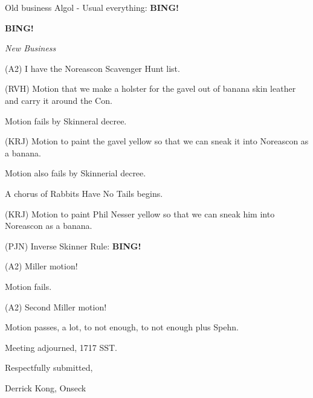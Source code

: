 \documentclass[12pt]{article}
\newcommand{\bing}{{\bf BING!} }
\newcommand{\goto}[1]{\bing \vskip 12pt \centerline{{\em{#1}}}}
\begin{document}
Old business Algol - Usual everything: \bing

\goto{New Business}

(A2) I have the Noreascon Scavenger Hunt list.

(RVH) Motion that we make a holster for the gavel out of banana skin leather and carry it around the Con.

Motion fails by Skinneral decree.

(KRJ) Motion to paint the gavel yellow so that we can sneak it into Noreascon as a banana.

Motion also fails by Skinnerial decree.

A chorus of Rabbits Have No Tails begins.

(KRJ) Motion to paint Phil Nesser yellow so that we can sneak him into Noreascon as a banana.

(PJN) Inverse Skinner Rule: \bing

(A2) Miller motion!

Motion fails.

(A2) Second Miller motion!

Motion passes, a lot, to not enough, to not enough plus Spehn.

\vspace{12pt}

\noindent
Meeting adjourned, 1717 SST.

\vspace{18pt}

\centerline{Respectfully submitted,}
\centerline{Derrick Kong, Onseck}
\end{document}
